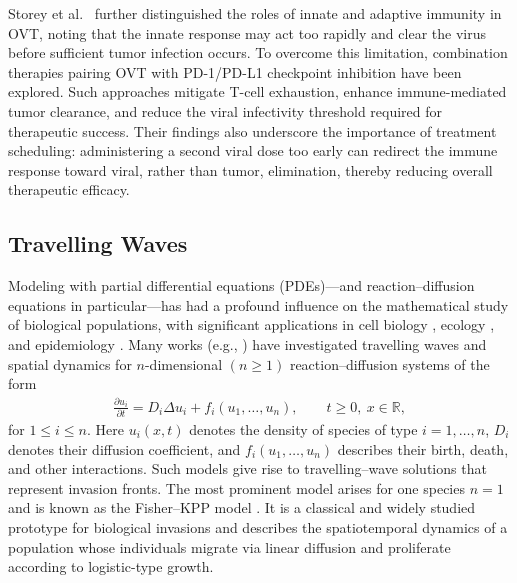 \documentclass[11pt]{article}
\theoremstyle{definition}
\begin{document}
Storey et al.~\cite{storey} further distinguished the roles of innate and adaptive immunity in OVT, noting that the innate response may act too rapidly and clear the virus before sufficient tumor infection occurs. To overcome this limitation, combination therapies pairing OVT with PD-1/PD-L1 checkpoint inhibition have been explored. Such approaches mitigate T-cell exhaustion, enhance immune-mediated tumor clearance, and reduce the viral infectivity threshold required for therapeutic success. Their findings also underscore the importance of treatment scheduling: administering a second viral dose too early can redirect the immune response toward viral, rather than tumor, elimination, thereby reducing overall therapeutic efficacy.


 \subsection{Travelling Waves} 

Modeling with partial differential equations (PDEs)—and reaction–diffusion equations in particular—has had a profound influence on the mathematical study of biological populations, with significant applications in cell biology \cite{SherrattJA1992Ewht_murray_cell_traveling, LagergrenJohnH.2020Bnng_Cell_travelingwave}, ecology \cite{SkellamJ.G.1991Rdit_ecology_travelingwave, LevinSimonA.2003TEAE_ecology_travelingwave}, and epidemiology \cite{ZhangTianran2014Eotw_wang_epidomy_travelingwave, WangHaiyan2011SSaT_epidemy_travekingwave}. Many works (e.g., \cite{murray, Britton, volpretVolpretVolpret, smoller_alma991043704819909116}) have investigated travelling waves and spatial dynamics for $n$-dimensional $(n\ge 1)$ reaction–diffusion systems of the form
\begin{align}\label{base_diffusion}
    \frac{\partial u_i}{\partial t}
    = D_i \Delta u_i + f_i(u_1,\ldots,u_n),
    \qquad t \ge 0,\ x \in \mathbb{R},
\end{align}
for $1\le i\le n$. Here $u_i(x,t)$ denotes the density of species of type $i=1,\dots,n$, $D_i$ denotes their diffusion coefficient, and $f_i(u_1,\dots,u_n)$ describes their birth, death, and other interactions.  
Such models give rise to travelling–wave solutions that represent invasion fronts. The most prominent model arises for one species $n=1$ and is known as the Fisher–KPP model \cite{murray, Britton}. It is a classical and widely studied prototype for biological invasions and describes the spatiotemporal dynamics of a population whose individuals migrate via linear diffusion and proliferate according to logistic-type  growth.
\end{document}
